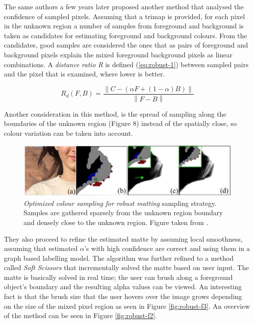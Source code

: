 The same authors a few years later proposed another method \cite{robust} that analysed the confidence of sampled pixels. Assuming that a trimap is provided, for each pixel in the unknown region a number of samples from foreground and background is taken as candidates for estimating foreground and background colours. From the candidates, good samples are considered the ones that as pairs of foreground and background pixels explain the mixed foreground background pixels as linear combinations. A \textit{distance ratio R} is defined (\ref{eq:robust-1}) between sampled pairs and the pixel that is examined, where lower is better. 

\begin{equation} \label{eq:robust-1}
R_{d}(F,B)=\frac{\left \| C-(\alpha F+(1-\alpha)B) \right \|}{\left \| F-B \right \|}
\end{equation}

Another consideration in this method, is the spread of sampling along the boundaries of the unknown region (Figure 8) instead of the spatially close, so colour variation can be taken into account.

\begin{figure}[t!]
\centering
\includegraphics[width=1\columnwidth]{Chapter2/2/robust_figure_1.jpg}
\caption[Robust matting sampling strategy.]{\textit{Optimized colour sampling for robust matting} sampling strategy. Samples are gathered sparsely from the unknown region boundary and densely close to the unknown region. Figure taken from \cite{robust}.}
\label{fig:robust-f1}
\end{figure}

They also proceed to refine the estimated matte by assuming local smoothness, assuming that estimated $\alpha$’s with high confidence are correct and using them in a graph based labelling model.
The algorithm was further refined to a method called \textit{Soft Scissors} \cite{softscissors} that incrementally solved the matte based on user input. The matte is basically solved in real time; the user can brush along a foreground object’s boundary and the resulting alpha values can be viewed. An interesting fact is that the brush size that the user hovers over the image grows depending on the size of the mixed pixel region as seen in Figure \ref{fig:robust-f3}. An overview of the method can be seen in Figure \ref{fig:robust-f2}. 

